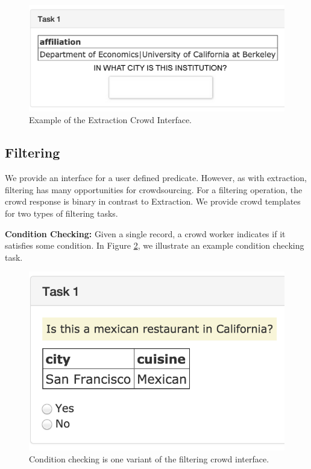 \begin{figure}[ht!]
\centering
\includegraphics[scale=0.25]{figs/entry.png}
\caption{Example of the Extraction Crowd Interface. \label{fig:entry}}\vspace{-.5em}
\end{figure}

\subsection{Filtering}
We provide an interface for a user defined predicate.
However, as with extraction, filtering has many opportunities for crowdsourcing.
For a filtering operation, the crowd response is binary in contrast to Extraction.
We provide crowd templates for two types of filtering tasks.

\noindent\textbf{Condition Checking: } Given a single record, a crowd worker indicates if it satisfies some condition. In Figure \ref{fig:condition},
we illustrate an example condition checking task.
\begin{figure}[ht!]
\centering
\includegraphics[scale=0.25]{figs/condition.png}
\caption{Condition checking is one variant of the filtering crowd interface.\label{fig:condition}}\vspace{-.5em}
\end{figure}

